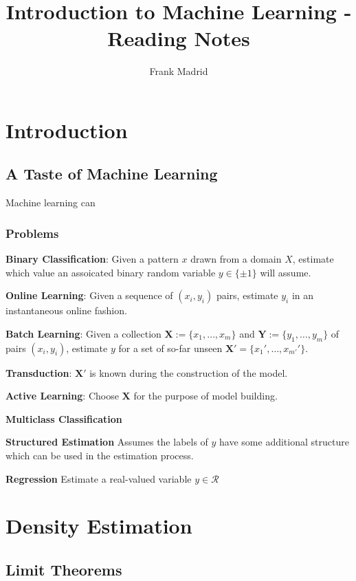 \documentclass{article}
\theoremstyle{definition}
\begin{document}
\title{Introduction to Machine Learning - Reading Notes}
\author{Frank Madrid}
\maketitle
\tableofcontents

\section{Introduction}
\subsection{A Taste of Machine Learning}
Machine learning can 
\subsubsection{Problems}
\textbf{Binary Classification}:
Given a pattern $x$ drawn from a domain $X$, estimate which value an assoicated binary random variable $y \in \{\pm1\}$ will assume.
\begin{list}{}{}
	\item \textbf{Online Learning}: Given a sequence of $(x_i,y_i)$ pairs, estimate $y_i$ in an instantaneous online fashion.
	\item \textbf{Batch Learning}: Given a collection $\mathbf{X}:=\{x_1,\ldots,x_m\}$ and $\mathbf{Y}:=\{y_1,\ldots,y_m\}$ of pairs $(x_i,y_i)$, estimate $y$ for a set of so-far unseen $\mathbf{X'}=\{x_1',\ldots,x_{m'}'\}$.
	\item \textbf{Transduction}: $\mathbf{X'}$ is known during the construction of the model.
	\item \textbf{Active Learning}: Choose $\mathbf{X}$ for the purpose of model building.
\end{list}

\noindent\textbf{Multiclass Classification}

\noindent\textbf{Structured Estimation}
Assumes the labels of $y$ have some additional structure which can be used in the estimation process.

\noindent\textbf{Regression} Estimate a real-valued variable $y \in \mathcal{R}$

\section{Density Estimation}
\subsection{Limit Theorems}
\end{document}
